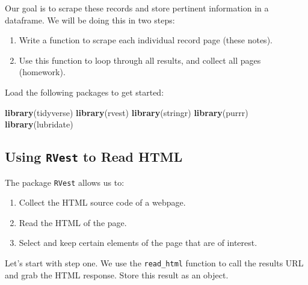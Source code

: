 \documentclass[
]{book}
\newenvironment{Shaded}{\begin{snugshade}}{\end{snugshade}}
\newcommand{\KeywordTok}[1]{\textcolor[rgb]{0.13,0.29,0.53}{\textbf{#1}}}
\newcommand{\NormalTok}[1]{#1}
\providecommand{\tightlist}{%
  \setlength{\itemsep}{0pt}\setlength{\parskip}{0pt}}
\begin{document}
Our goal is to scrape these records and store pertinent information in a dataframe. We will be doing this in two steps:

\begin{enumerate}
\def\labelenumi{\arabic{enumi}.}
\tightlist
\item
  Write a function to scrape each individual record page (these notes).
\item
  Use this function to loop through all results, and collect all pages (homework).
\end{enumerate}

Load the following packages to get started:

\begin{Shaded}
\begin{Highlighting}[]
\KeywordTok{library}\NormalTok{(tidyverse)}
\KeywordTok{library}\NormalTok{(rvest)}
\KeywordTok{library}\NormalTok{(stringr)}
\KeywordTok{library}\NormalTok{(purrr)}
\KeywordTok{library}\NormalTok{(lubridate)}
\end{Highlighting}
\end{Shaded}

\hypertarget{using-rvest-to-read-html}{%
\subsection{\texorpdfstring{Using \texttt{RVest} to Read HTML}{Using RVest to Read HTML}}\label{using-rvest-to-read-html}}

The package \texttt{RVest} allows us to:

\begin{enumerate}
\def\labelenumi{\arabic{enumi}.}
\tightlist
\item
  Collect the HTML source code of a webpage.
\item
  Read the HTML of the page.
\item
  Select and keep certain elements of the page that are of interest.
\end{enumerate}

Let's start with step one. We use the \texttt{read\_html} function to call the results URL and grab the HTML response. Store this result as an object.
\end{document}
